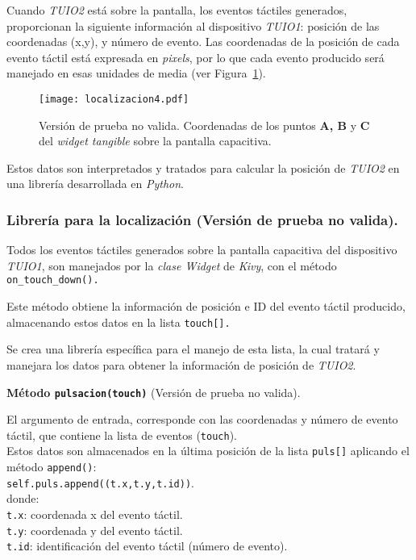 Cuando \emph{TUIO2} está sobre la pantalla, los eventos táctiles generados, proporcionan la siguiente información al dispositivo \emph{TUIO1}: posición de las coordenadas (x,y), y número de evento. Las coordenadas de la posición de cada evento táctil está expresada en \emph{pixels}, por lo que cada evento producido será manejado en esas unidades de media (ver Figura~\ref{fig:Localizacion4}).\\
\begin{figure}[!h]
\begin{center}
\texttt{[image: localizacion4.pdf]}
\caption{Versión de prueba no valida. Coordenadas de los puntos \textbf{A, B} y \textbf{C} del \emph{widget tangible} sobre la pantalla capacitiva. }
\label{fig:Localizacion4}
\end{center}
\end{figure}
Estos datos son interpretados y tratados para calcular la posición de \emph{TUIO2} en una librería desarrollada en \emph{Python}.

\subsubsection{Librería para la localización (Versión de prueba no valida).}

Todos los eventos táctiles generados sobre la pantalla capacitiva del dispositivo \emph{TUIO1}, son manejados por la \emph{clase Widget} de \emph{Kivy}, con el método \texttt{on\_touch\_down().}

Este método obtiene la información de posición e ID del evento táctil producido, almacenando estos datos en la lista \texttt{touch[].}

Se crea una librería específica para el manejo de esta lista, la cual tratará y manejara los datos para obtener la información de posición de \emph{TUIO2}.

\textbf{Método \texttt{pulsacion(touch)}} (Versión de prueba no valida).

El argumento de entrada, corresponde con las coordenadas y número de evento táctil, que contiene la lista de eventos (\texttt{touch}).\\
Estos datos son almacenados en la última posición de la lista \texttt{puls[]} aplicando el método \texttt{append()}:\\
\texttt{self.puls.append((t.x,t.y,t.id))}.\\
donde: \\
\texttt{t.x}: coordenada x del evento táctil.\\
\texttt{t.y}: coordenada y del evento táctil.\\
\texttt{t.id}: identificación del evento táctil (número de evento).

